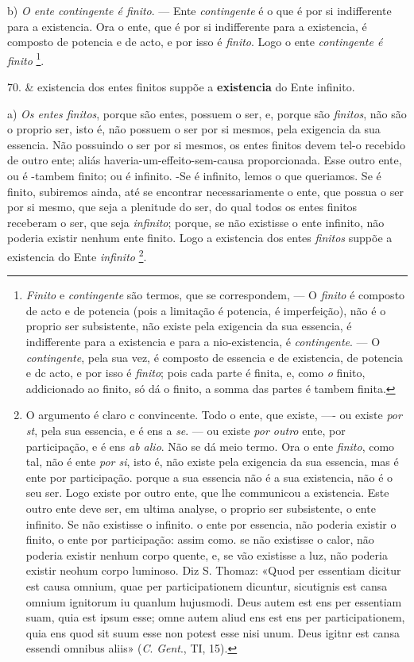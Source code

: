 b) \emph{O ente contingente é finito}. --- Ente \emph{contingente} é o que é por si indifferente para a existencia. Ora o ente, que é por si indifferente para a existencia, é composto de potencia e de acto, e por isso é \emph{finito}. Logo o ente \emph{contingente é finito} \footnote{\emph{Finito} e \emph{contingente} são termos, que se correspondem, --- O \emph{finito} é composto de acto e de potencia (pois a limitação é potencia, é imperfeição), não é o proprio ser subsistente, não existe pela exigencia da sua essencia, é indifferente para a existencia e para a nio-existencia, é \emph{contingente}. --- O \emph{contingente}, pela sua vez, é composto de essencia e de existencia, de potencia e dc acto, e por isso é \emph{finito}; pois cada parte é finita, e, como \emph{o} finito, addicionado ao finito, só dá o finito, a somma das partes é tambem finita.}.

70. \& existencia dos entes finitos suppõe a \textbf{existencia} do Ente infinito.

a) \emph{Os entes finitos}, porque são entes, possuem o ser, e, porque são \emph{finitos}, não são o proprio ser, isto é, não possuem o ser por si mesmos, pela exigencia da sua essencia. Não possuindo o ser por si mesmos, os entes finitos devem tel-o recebido de outro ente; aliás haveria-um-effeito-sem-causa proporcionada. Esse outro ente, ou é -tambem finito; ou é infinito. -Se é infinito, lemos o que queriamos. Se é finito, subiremos ainda, até se encontrar necessariamente o ente, que possua o ser por si mesmo, que seja a plenitude do ser, do qual todos os entes finitos receberam o ser, que seja \emph{infinito}; porque, se não existisse o ente infinito, não poderia existir nenhum ente finito. Logo a existencia dos entes \emph{finitos} suppõe a existencia do Ente \emph{infinito} \footnote{O argumento é claro c convincente. Todo o ente, que existe, ---- ou existe \emph{por st}, pela sua essencia, e é ens a \emph{se}. --- ou existe \emph{por outro} ente, por participação, e é ens \emph{ab alio}. Não se dá meio termo. Ora o ente \emph{finito}, como tal, não é ente \emph{por si}, isto é, não existe pela exigencia da sua essencia, mas é ente por participação. porque a sua essencia não é a sua existencia, não é o seu ser. Logo existe por outro ente, que lhe communicou a existencia. Este outro ente deve ser, em ultima analyse, o proprio ser subsistente, o ente infinito. Se não existisse o infinito. o ente por essencia, não poderia existir o finito, o ente por participação: assim como. se não existisse o calor, não poderia existir nenhum corpo quente, e, se vão existisse a luz, não poderia existir neohum corpo luminoso. Diz S. Thomaz: «Quod per essentiam dicitur est causa omnium, quae per participationem dicuntur, sicutignis est cansa omnium ignitorum iu quanlum hujusmodi. Deus autem est ens per essentiam suam, quia est ipsum esse; omne autem aliud ens est ens per participationem, quia ens quod sit suum esse non potest esse nisi unum. Deus igitnr est cansa essendi omnibus aliis» (\emph{C}. \emph{Gent}., TI, 15).}.

